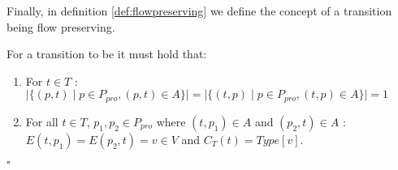 \noindent
Finally, in definition \ref{def:flowpreserving} we define the concept of a transition being flow preserving.

\begin{definition}
\label{def:flowpreserving}
For a transition to be  it must hold that:

\begin{enumerate}
\item For $t \in T$ :\\
$\mid \{ (p, t) \mid p \in P_{pro}, (p, t) \in A \}\mid = \mid \{ (t, p) \mid p \in P_{pro}, (t, p) \in A \}\mid = 1$


\item For all $t \in T$, $p_{1}, p_{2} \in P_{pro}$ where $(t, p_{1}) \in A$ and $(p_{2}, t) \in A$ : $E(t, p_{1}) = E(p_{2}, t) = v \in V$ and $C_{T}(t) = Type[v]$.

\end{enumerate}
\flushright $\square$
\end{definition}
